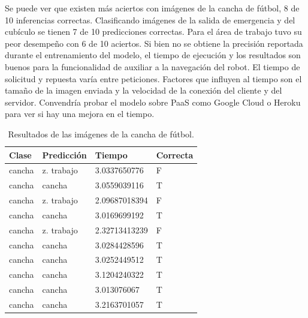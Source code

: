 Se puede ver que existen más aciertos
con imágenes de la cancha de fútbol, 8 de 10 inferencias correctas.
Clasificando imágenes de la salida de emergencia
y del cubículo se tienen 7 de 10 predicciones correctas.
Para el área de trabajo tuvo su peor desempeño con 6 de
10 aciertos. Si bien no se obtiene
la precisión reportada durante el
entrenamiento del modelo, el tiempo
de ejecución y los
resultados son buenos
para la funcionalidad de
auxiliar a la navegación del robot.
El tiempo de solicitud y repuesta varía entre peticiones.
Factores que influyen al tiempo son el tamaño de la 
imagen enviada y la velocidad de la conexión del cliente
y del servidor. Convendría probar el modelo sobre PaaS
como Google Cloud o Heroku para ver si hay una mejora
en el tiempo.



\begin{table}[!h]
\centering
\begin{tabular}{|l|l|l|l|}
\hline
Clase        & Predicción   & Tiempo        & Correcta \\ \hline
cancha & z. trabajo        & 3.0337650776 & F        \\ \hline
cancha & cancha & 3.0559039116 & T        \\ \hline
cancha & z. trabajo        & 2.09687018394 & F        \\ \hline
cancha & cancha & 3.0169699192 & T        \\ \hline
cancha & z. trabajo        & 2.32713413239 & F        \\ \hline
cancha & cancha & 3.0284428596 & T        \\ \hline
cancha & cancha & 3.0252449512 & T        \\ \hline
cancha & cancha & 3.1204240322 & T        \\ \hline
cancha & cancha & 3.013076067  & T        \\ \hline
cancha & cancha & 3.2163701057 & T        \\ \hline
\end{tabular}
\caption{Resultados de las imágenes de la cancha de fútbol.}
\label{table:soccer_nao_results}
\end{table}

